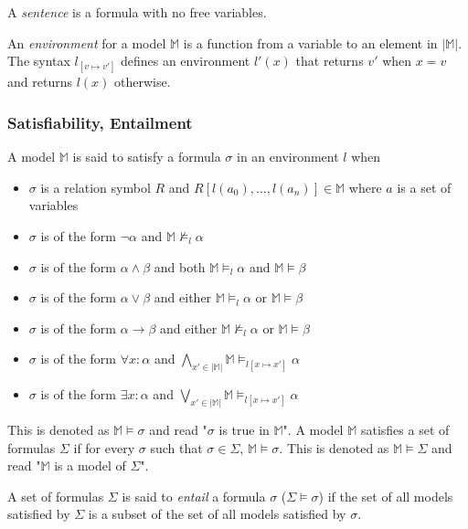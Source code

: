 			A \emph{sentence} is a formula with no free variables.

			An \emph{environment} for a model $\mathbb{M}$ is a function from a
			variable to an element in $|\mathbb{M}|$. The syntax $l_{[v \mapsto
			v']}$ defines an environment $l'(x)$ that returns $v'$ when $x=v$
			and returns $l(x)$ otherwise.

		\subsubsection{Satisfiability, Entailment}

			A model $\mathbb{M}$ is said to satisfy a formula $\sigma$ in an environment $l$ when
			\begin{itemize}
			\item $\sigma$ is a relation symbol $R$ and $R[l(a_0) , \ldots , l(a_n)] \in \mathbb{M}$ where $a$ is a set of variables
			\item $\sigma$ is of the form $\neg\alpha$ and $\mathbb{M} \not\models_l \alpha$
			\item $\sigma$ is of the form $\alpha\wedge\beta$ and both $\mathbb{M} \models_l \alpha$ and $\mathbb{M} \models \beta$
			\item $\sigma$ is of the form $\alpha\vee\beta$ and either $\mathbb{M} \models_l \alpha$ or $\mathbb{M} \models \beta$
			\item $\sigma$ is of the form $\alpha\to\beta$ and either $\mathbb{M} \not\models_l \alpha$ or $\mathbb{M} \models \beta$
			\item $\sigma$ is of the form $\forall x : \alpha$  and $\displaystyle\bigwedge_{x' \in |\mathbb{M}|} \mathbb{M} \models_{l[x \mapsto x']} \alpha$
			\item $\sigma$ is of the form $\exists x : \alpha$  and $\displaystyle\bigvee_{x' \in |\mathbb{M}|} \mathbb{M} \models_{l[x \mapsto x']} \alpha$
			\end{itemize}
			This is denoted as $\mathbb{M} \models \sigma$ and read "$\sigma$
			is true in $\mathbb{M}$".  A model $\mathbb{M}$ satisfies a set of
			formulas $\Sigma$ if for every $\sigma$ such that $\sigma \in
			\Sigma$, $\mathbb{M} \models \sigma$.  This is denoted as
			$\mathbb{M} \models \Sigma$ and read "$\mathbb{M}$ is a model of
			$\Sigma$".

			A set of formulas $\Sigma$ is said to \emph{entail} a formula
			$\sigma$ ($\Sigma \models \sigma$) if the set of all models
			satisfied by $\Sigma$ is a subset of the set of all models
			satisfied by $\sigma$.

